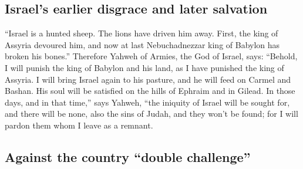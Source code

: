 \hypertarget{israels-earlier-disgrace-and-later-salvation}{%
\subsection{Israel's earlier disgrace and later
salvation}\label{israels-earlier-disgrace-and-later-salvation}}

 ``Israel is a hunted sheep. The lions have driven him
away. First, the king of Assyria devoured him, and now at last
Nebuchadnezzar king of Babylon has broken his bones.'' 
Therefore Yahweh of Armies, the God of Israel, says: ``Behold, I will
punish the king of Babylon and his land, as I have punished the king of
Assyria.  I will bring Israel again to his pasture, and
he will feed on Carmel and Bashan. His soul will be satisfied on the
hills of Ephraim and in Gilead.  In those days, and in
that time,'' says Yahweh, ``the iniquity of Israel will be sought for,
and there will be none, also the sins of Judah, and they won't be found;
for I will pardon them whom I leave as a remnant.

\hypertarget{against-the-country-double-challenge}{%
\subsection{Against the country ``double
challenge''}\label{against-the-country-double-challenge}}

